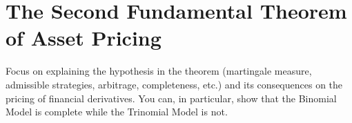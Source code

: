 \documentclass{article}
\numberwithin{equation}{section}
\begin{document}
\newpage

\section{The Second Fundamental Theorem of Asset Pricing}
Focus on explaining the hypothesis in the theorem (martingale measure, admissible strategies, arbitrage, completeness, etc.) and its consequences on the pricing of financial derivatives. You can, in particular, show that the Binomial Model is complete while the Trinomial Model is not.
\end{document}
